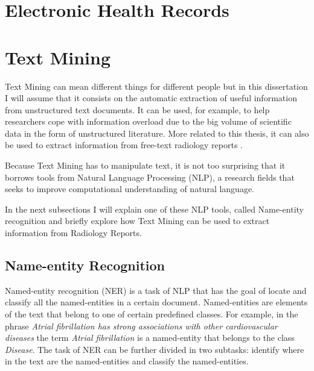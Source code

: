 \label{chap2}


\section{Electronic Health Records}



\section{Text Mining}

Text Mining can mean different things for different people \citep{Hotho2005} but in this dissertation I will assume that it consists on the automatic extraction of useful information from unstructured text documents. It can be used, for example, to help researchers cope with information overload \citep{Cohen2005a} due to the big volume of scientific data in the form of unstructured literature. More related to this thesis, it can also be used to extract information from free-text radiology reports \citep{Pons2016}. 

Because Text Mining has to manipulate text, it is not too surprising that it borrows tools from Natural Language Processing (NLP), a research fields that seeks to improve computational understanding of natural language. 

In the next subsections I will explain one of these NLP tools, called Name-entity recognition and briefly explore how Text Mining can be used to extract information from Radiology Reports.

\subsection{Name-entity Recognition}

Named-entity recognition (NER) is a task of NLP that has the goal of locate and classify all the named-entities in a certain document. Named-entities are elements of the text that belong to one of certain predefined classes. For example, in the phrase \textit{Atrial fibrillation has strong associations with other cardiovascular diseases} the term \textit{Atrial fibrillation} is a named-entity that belongs to the class \textit{Disease}. The task of NER can be further divided in two subtasks: identify where in the text are the named-entities and classify the named-entities.

